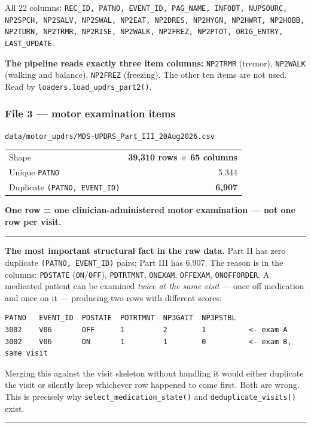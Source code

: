 \documentclass[11pt,a4paper]{article}
\newcommand{\code}[1]{\texttt{\small #1}}
\newenvironment{keypoint}
  {\begin{center}\begin{minipage}{0.95\textwidth}%
   \vspace{4pt}\hrule\vspace{7pt}\small}
  {\vspace{7pt}\hrule\vspace{4pt}\end{minipage}\end{center}}
\begin{document}
All 22 columns: \code{REC\_ID, PATNO, EVENT\_ID, PAG\_NAME, INFODT, NUPSOURC,
NP2SPCH, NP2SALV, NP2SWAL, NP2EAT, NP2DRES, NP2HYGN, NP2HWRT, NP2HOBB,
NP2TURN, NP2TRMR, NP2RISE, NP2WALK, NP2FREZ, NP2PTOT, ORIG\_ENTRY,
LAST\_UPDATE}.

\textbf{The pipeline reads exactly three item columns:} \code{NP2TRMR}
(tremor), \code{NP2WALK} (walking and balance), \code{NP2FREZ} (freezing). The
other ten items are not used. Read by \code{loaders.load\_updrs\_part2()}.

\subsubsection*{File 3 --- motor examination items}

\code{data/motor\_updrs/MDS-UPDRS\_Part\_III\_20Aug2026.csv}

\begin{table}[h]
\centering
\begin{tabular}{@{}lr@{}}
\toprule
Shape & \textbf{39{,}310 rows $\times$ 65 columns} \\
Unique \code{PATNO} & 5{,}344 \\
Duplicate \code{(PATNO, EVENT\_ID)} & \textcolor{warn}{\textbf{6{,}907}} \\
\bottomrule
\end{tabular}
\end{table}

\noindent
\textbf{One row = one clinician-administered motor examination --- not one row
per visit.}

\begin{keypoint}
\textbf{The most important structural fact in the raw data.} Part II has zero
duplicate \code{(PATNO, EVENT\_ID)} pairs; Part III has 6{,}907. The reason is
in the columns: \code{PDSTATE} (\code{ON}/\code{OFF}), \code{PDTRTMNT},
\code{ONEXAM}, \code{OFFEXAM}, \code{ONOFFORDER}. A medicated patient can be
examined \emph{twice at the same visit} --- once off medication and once on it
--- producing two rows with different scores:

\begin{Verbatim}[fontsize=\small,xleftmargin=10pt]
PATNO   EVENT_ID  PDSTATE  PDTRTMNT  NP3GAIT  NP3PSTBL
3002    V06       OFF      1         2        1          <- exam A
3002    V06       ON       1         1        0          <- exam B, same visit
\end{Verbatim}

Merging this against the visit skeleton without handling it would either
duplicate the visit or silently keep whichever row happened to come first. Both
are wrong. This is precisely why \code{select\_medication\_state()} and
\code{deduplicate\_visits()} exist.
\end{keypoint}
\end{document}

